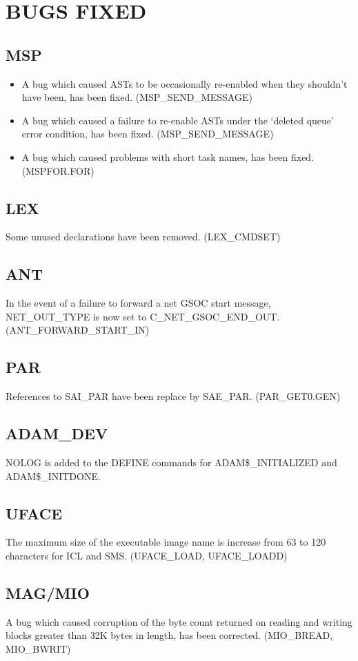 \section{BUGS FIXED}

\subsection{MSP}
\begin{itemize}
\item A bug which caused ASTs to be occasionally re-enabled when they
shouldn't have been, has been fixed. (MSP\_SEND\_MESSAGE)
\item A bug which caused a failure to re-enable ASTs under the `deleted queue'
error condition, has been fixed. (MSP\_SEND\_MESSAGE)
\item A bug which caused problems with short task names, has been fixed.
(MSPFOR.FOR)
\end{itemize}

\subsection{LEX}
Some unused declarations have been removed. (LEX\_CMDSET)

\subsection{ANT}
In the event of a failure to forward a net GSOC start message, NET\_OUT\_TYPE
is now set to C\_NET\_GSOC\_END\_OUT. (ANT\_FORWARD\_START\_IN)

\subsection{PAR}
References to SAI\_PAR have been replace by SAE\_PAR.
(PAR\_GET0.GEN)

\subsection{ADAM\_DEV}
NOLOG is added to the DEFINE commands for ADAM\$\_INITIALIZED and
ADAM\$\_INITDONE.

\subsection{UFACE}
The maximum size of the executable image name is increase from 63 to 120
characters for ICL and SMS. (UFACE\_LOAD, UFACE\_LOADD)

\subsection{MAG/MIO}
A bug which caused corruption of the byte count returned on reading and writing
blocks greater than 32K bytes in length, has been corrected.
(MIO\_BREAD, MIO\_BWRIT)

